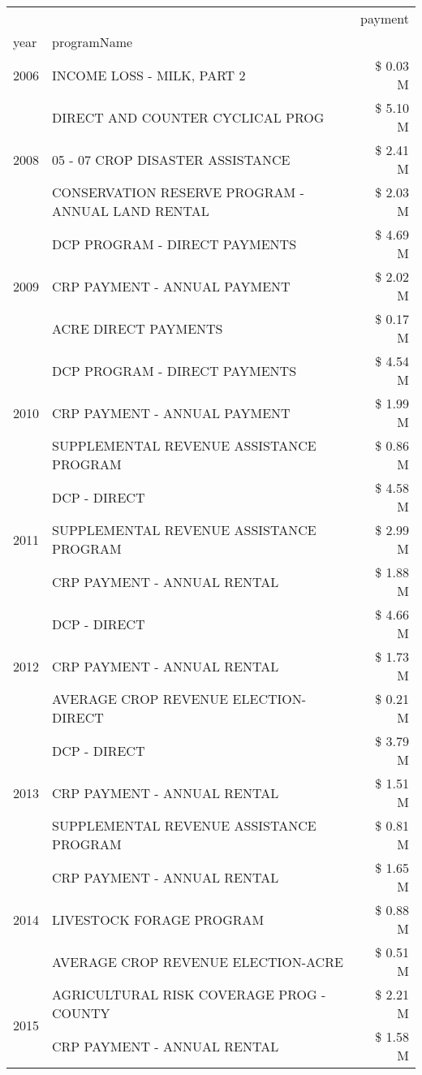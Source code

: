 \begin{tabular}{llr}
\toprule
 &  & payment \\
year & programName &  \\
\midrule
2006 & INCOME LOSS - MILK, PART 2 & \$ 0.03 M \\
\cline{1-3}
\multirow[t]{3}{*}{2008} & DIRECT AND COUNTER CYCLICAL PROG & \$ 5.10 M \\
 & 05 - 07 CROP DISASTER ASSISTANCE & \$ 2.41 M \\
 & CONSERVATION RESERVE PROGRAM - ANNUAL LAND RENTAL & \$ 2.03 M \\
\cline{1-3}
\multirow[t]{3}{*}{2009} & DCP PROGRAM - DIRECT PAYMENTS & \$ 4.69 M \\
 & CRP PAYMENT - ANNUAL PAYMENT & \$ 2.02 M \\
 & ACRE DIRECT PAYMENTS & \$ 0.17 M \\
\cline{1-3}
\multirow[t]{3}{*}{2010} & DCP PROGRAM - DIRECT PAYMENTS & \$ 4.54 M \\
 & CRP PAYMENT - ANNUAL PAYMENT & \$ 1.99 M \\
 & SUPPLEMENTAL REVENUE ASSISTANCE PROGRAM & \$ 0.86 M \\
\cline{1-3}
\multirow[t]{3}{*}{2011} & DCP - DIRECT & \$ 4.58 M \\
 & SUPPLEMENTAL REVENUE ASSISTANCE PROGRAM & \$ 2.99 M \\
 & CRP PAYMENT - ANNUAL RENTAL & \$ 1.88 M \\
\cline{1-3}
\multirow[t]{3}{*}{2012} & DCP - DIRECT & \$ 4.66 M \\
 & CRP PAYMENT - ANNUAL RENTAL & \$ 1.73 M \\
 & AVERAGE CROP REVENUE ELECTION-DIRECT & \$ 0.21 M \\
\cline{1-3}
\multirow[t]{3}{*}{2013} & DCP - DIRECT & \$ 3.79 M \\
 & CRP PAYMENT - ANNUAL RENTAL & \$ 1.51 M \\
 & SUPPLEMENTAL REVENUE ASSISTANCE PROGRAM & \$ 0.81 M \\
\cline{1-3}
\multirow[t]{3}{*}{2014} & CRP PAYMENT - ANNUAL RENTAL & \$ 1.65 M \\
 & LIVESTOCK FORAGE PROGRAM & \$ 0.88 M \\
 & AVERAGE CROP REVENUE ELECTION-ACRE & \$ 0.51 M \\
\cline{1-3}
\multirow[t]{3}{*}{2015} & AGRICULTURAL RISK COVERAGE PROG - COUNTY & \$ 2.21 M \\
 & CRP PAYMENT - ANNUAL RENTAL & \$ 1.58 M \\

\end{tabular}
